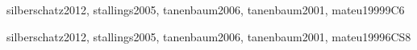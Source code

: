 \begin{syllabus}
\begin{unit}{\OSConcurrency}{}{silberschatz2012, stallings2005, tanenbaum2006, tanenbaum2001, mateu1999}{9}{C6}
\begin{topics}
      \item \OSConcurrencyTopicStates
      \item \OSConcurrencyTopicStructures
      \item \OSConcurrencyTopicDispatching
      \item \OSConcurrencyTopicTheRole
      \item \OSConcurrencyTopicManaging
      \item \OSConcurrencyTopicImplementing
      \item \OSConcurrencyTopicMultiprocessor
\end{topics}
\begin{learningoutcomes}
	\item \OSConcurrencyLODescribeTheConcurrency [\Familiarity]
	\item \OSConcurrencyLODemonstrateTheTime [\Usage]
	\item \OSConcurrencyLOSummarizeTheMechanisms [\Familiarity]
	\item \OSConcurrencyLOExplainTheThat [\Familiarity]
	\item \OSConcurrencyLOSummarizeTechniques [\Familiarity]
	\item \OSConcurrencyLODescribeReasons [\Familiarity]
	\item \OSConcurrencyLOCreateState [\Usage]
\end{learningoutcomes}
\end{unit}

\begin{unit}{\OSSchedulingandDispatch}{}{silberschatz2012, stallings2005, tanenbaum2006, tanenbaum2001, mateu1999}{6}{CS8}
\begin{topics}%
      \item \OSSchedulingandDispatchTopicPreemptive
      \item \OSSchedulingandDispatchTopicSchedulers
      \item \OSSchedulingandDispatchTopicProcesses
      \item \OSSchedulingandDispatchTopicDeadlines
\end{topics}
\begin{learningoutcomes}
	\item \OSSchedulingandDispatchLOCompareAndCommon  [\Assessment]
	\item \OSSchedulingandDispatchLODescribeRelationships [\Familiarity]
	\item \OSSchedulingandDispatchLODiscussTheProcessor [\Familiarity]
	\item \OSSchedulingandDispatchLODescribeTheProcesses [\Familiarity]
	\item \OSSchedulingandDispatchLOCompareAndAndTo  [\Assessment]
	\item \OSSchedulingandDispatchLODiscussThePreemption [\Familiarity]
	\item \OSSchedulingandDispatchLOIdentifyWays [\Familiarity]
\end{learningoutcomes}
\end{unit}


\end{syllabus}
